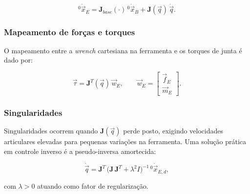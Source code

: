 \begin{equation}
{}^{0}\!\dot{\vec x}_{E} =
\mathbf{J}_{base}(\cdot)\,{}^{0}\!\dot{\vec x}_{B}
+ \mathbf{J}(\vec q)\,\dot{\vec q}.
\end{equation}

\subsubsection{Mapeamento de forças e torques}

O mapeamento entre a \emph{wrench} cartesiana na ferramenta e os torques de junta é dado por:

\begin{equation}
\vec\tau = \mathbf{J}^T (\vec q)\,\vec w_{E}, 
\qquad
\vec w_{E} =
\begin{bmatrix}
\vec f_{E} \\ \vec m_{E}
\end{bmatrix}.
\end{equation}

\subsubsection{Singularidades}

Singularidades ocorrem quando $\mathbf{J}(\vec q)$ perde posto, exigindo velocidades articulares elevadas para pequenas variações na ferramenta. 
Uma solução prática em controle inverso é a pseudo-inversa amortecida:

\begin{equation}
\label{eq:pseudoinversa}
\dot{\vec q} =
\mathbf{J}^T\,\big(\mathbf{J}\,\mathbf{J}^T
+ \lambda^2 I\big)^{-1}\,{}^{0}\!\dot{\vec x}_{E,d},
\end{equation}

com $\lambda > 0$ atuando como fator de regularização.
